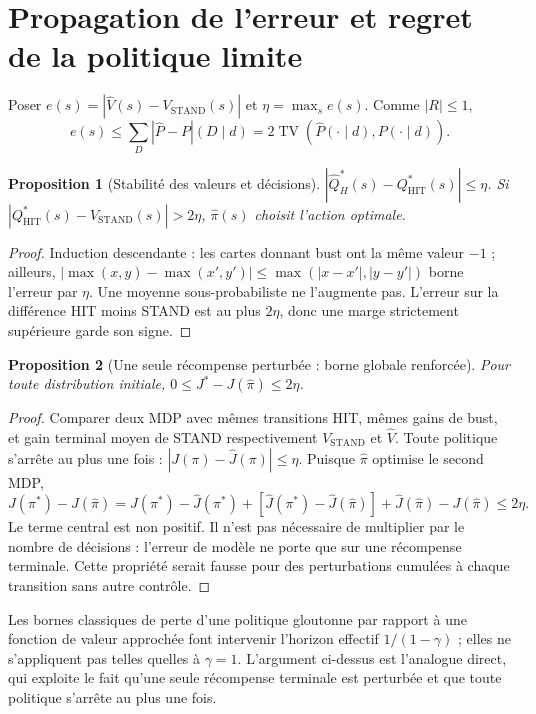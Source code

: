 \documentclass[11pt,a4paper]{article}
\newtheorem{proposition}{Proposition}
\theoremstyle{remark}\newtheorem*{remarque}{Remarque}
\newcommand{\1}{\mathbf 1}
\newcommand{\VS}{V_{\mathrm{STAND}}}
\newcommand{\QH}{Q^*_{\mathrm{HIT}}}
\newcommand{\TV}{\operatorname{TV}}
\begin{document}
\section{Propagation de l'erreur et regret de la politique limite}
Poser $e(s)=|\widehat V(s)-\VS(s)|$ et $\eta=\max_s e(s)$.
Comme $|R|\le1$,
\[
 e(s)\le\sum_D|\widehat P-P|(D\mid d)
       =2\TV(\widehat P(\cdot\mid d),P(\cdot\mid d)).
\]
\begin{proposition}[Stabilité des valeurs et décisions]
$|\widehat Q^*_H(s)-\QH(s)|\le\eta$. Si
$|\QH(s)-\VS(s)|>2\eta$, $\widehat\pi(s)$ choisit l'action optimale.
\end{proposition}
\begin{proof}
Induction descendante : les cartes donnant bust ont la même valeur $-1$ ;
ailleurs, $|\max(x,y)-\max(x',y')|\le\max(|x-x'|,|y-y'|)$ borne l'erreur
par $\eta$. Une moyenne sous-probabiliste ne l'augmente pas.
L'erreur sur la différence HIT moins STAND est au plus $2\eta$, donc une
marge strictement supérieure garde son signe.
\end{proof}

\begin{proposition}[Une seule récompense perturbée : borne globale renforcée]
Pour toute distribution initiale, $0\le J^*-J(\widehat\pi)\le2\eta$.
\end{proposition}
\begin{proof}
Comparer deux MDP avec mêmes transitions HIT, mêmes gains de bust, et gain
terminal moyen de STAND respectivement $\VS$ et $\widehat V$. Toute politique
s'arrête au plus une fois : $|J(\pi)-\widehat J(\pi)|\le\eta$.
Puisque $\widehat\pi$ optimise le second MDP,
\[
 J(\pi^*)-J(\widehat\pi)
 =J(\pi^*)-\widehat J(\pi^*)+
 [\widehat J(\pi^*)-\widehat J(\widehat\pi)]+
 \widehat J(\widehat\pi)-J(\widehat\pi)\le2\eta.
\]
Le terme central est non positif. Il n'est pas nécessaire de multiplier par
le nombre de décisions : l'erreur de modèle ne porte que sur une récompense
terminale. Cette propriété serait fausse pour des perturbations cumulées à
chaque transition sans autre contrôle.
\end{proof}
Les bornes classiques de perte d'une politique gloutonne par rapport à une fonction
de valeur approchée \cite{singhyee} font intervenir l'horizon effectif
$1/(1-\gamma)$ ; elles ne s'appliquent pas telles quelles à $\gamma=1$. L'argument
ci-dessus est l'analogue direct, qui exploite le fait qu'une seule récompense
terminale est perturbée et que toute politique s'arrête au plus une fois.
\end{document}
